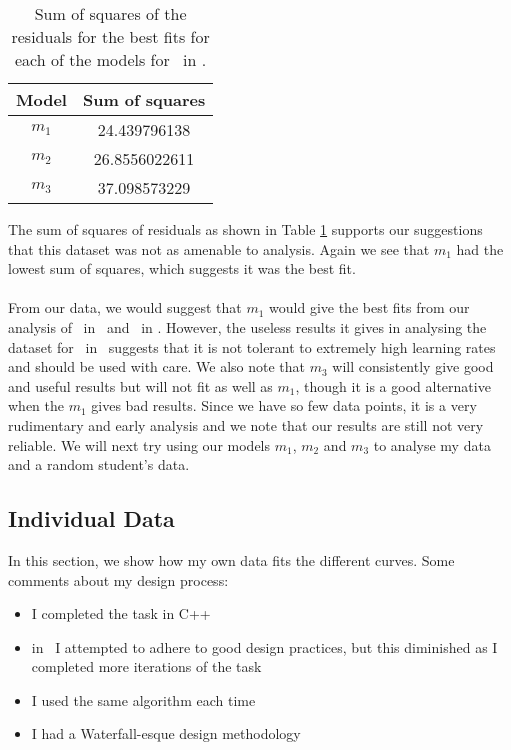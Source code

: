 \begin{table}[ht!]
\centering
\begin{tabular}{|c|c|}
\hline
{\bf Model} & Sum of squares \\
\hline
$m_1$ & 24.439796138\\
\hline
$m_2$ & 26.8556022611\\
\hline
$m_3$ & 37.098573229\\
\hline
\end{tabular}
\caption{Sum of squares of the residuals for the best fits for each of the models for \PT\ in \LA.}
\label{table:P2LA:abc:sumsquares}
\end{table}

The sum of squares of residuals as shown in Table \ref{table:P2LA:abc:sumsquares}
supports our suggestions that this dataset was not as amenable to analysis.
Again we see that $m_1$ had the lowest sum of squares, which suggests it was the
best fit.\\
\\
From our data, we would suggest that $m_1$ would give the best fits from our analysis of \PT\
in \LA\ and \PO\ in \LB.
However, the useless results it gives in analysing the dataset for \PO\ in \LA\
suggests that it is not tolerant to extremely high learning rates and should be
used with care.
We also note that $m_3$ will consistently give good and useful results but will
not fit as well as $m_1$, though it is a good alternative when the $m_1$ gives
bad results.
Since we have so few data points, it is a very rudimentary and early analysis
and we note that our results are still not very reliable.
We will next try using our models $m_1$, $m_2$ and $m_3$ to analyse my data and
a random student's data.

\subsection{Individual Data}

In this section, we show how my own data fits the different curves.
Some comments about my design process:
\begin{itemize}
  \item I completed the task in C++
  \item in \AZ\ I attempted to adhere to good design practices, but this
  diminished as I completed more iterations of the task
  \item I used the same algorithm each time
  \item I had a Waterfall-esque design methodology
\end{itemize}

